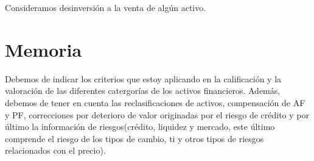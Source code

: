 Consideramos desinversión a la venta de algún activo. 

\section{Memoria}

Debemos de indicar los criterios que estoy aplicando en la calificación y la valoración de las diferentes catergorías de los activos financieros. 
Además, debemos de tener en cuenta las reclasificaciones de activos, compensación de AF y PF, correcciones por deterioro de valor originadas por el riesgo de crédito y por último la información de riesgos(crédito, liquidez y mercado, este último comprende el riesgo de los tipos de cambio, ti y otros tipos de riesgos relacionados con el precio).


